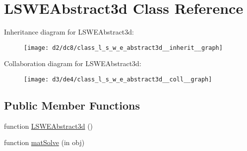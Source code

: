 \hypertarget{class_l_s_w_e_abstract3d}{}\section{L\+S\+W\+E\+Abstract3d Class Reference}
\label{class_l_s_w_e_abstract3d}


Inheritance diagram for L\+S\+W\+E\+Abstract3d\+:
\nopagebreak
\begin{figure}[H]
\begin{center}
\leavevmode
\texttt{[image: d2/dc8/class\_l\_s\_w\_e\_abstract3d\_\_inherit\_\_graph]}
\end{center}
\end{figure}


Collaboration diagram for L\+S\+W\+E\+Abstract3d\+:
\nopagebreak
\begin{figure}[H]
\begin{center}
\leavevmode
\texttt{[image: d3/de4/class\_l\_s\_w\_e\_abstract3d\_\_coll\_\_graph]}
\end{center}
\end{figure}
\subsection*{Public Member Functions}
\begin{DoxyCompactItemize}
\item 
function \hyperlink{class_l_s_w_e_abstract3d_a730cff47d47f038a7e9a0bead5e394b3}{L\+S\+W\+E\+Abstract3d} ()
\item 
function \hyperlink{class_l_s_w_e_abstract3d_a9625ff6beff334b0cb2911cd52f1185b}{mat\+Solve} (in obj)
\end{DoxyCompactItemize}
